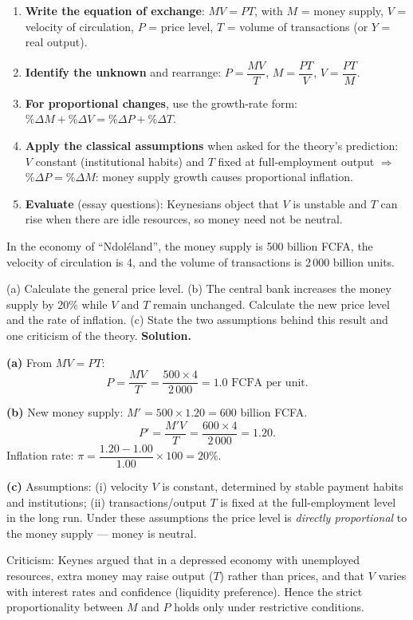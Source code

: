 \documentclass[11pt]{article}
\newcommand{\cle}[1]{{\popxbold\color{popdark}#1}}
\begin{document}
\begin{methode}[Using Fisher's equation $MV = PT$ (or $MV = PY$)]
\begin{enumerate}
\item \textbf{Write the equation of exchange}: $MV = PT$, with $M$ = money supply, $V$ = velocity of circulation, $P$ = price level, $T$ = volume of transactions (or $Y$ = real output).
\item \textbf{Identify the unknown} and rearrange: $P = \dfrac{MV}{T}$, $M = \dfrac{PT}{V}$, $V = \dfrac{PT}{M}$.
\item \textbf{For proportional changes}, use the growth-rate form: $\%\Delta M + \%\Delta V = \%\Delta P + \%\Delta T$.
\item \textbf{Apply the classical assumptions} when asked for the theory's prediction: $V$ constant (institutional habits) and $T$ fixed at full-employment output $\Rightarrow$ $\%\Delta P = \%\Delta M$: money supply growth causes proportional inflation.
\item \textbf{Evaluate} (essay questions): Keynesians object that $V$ is unstable and $T$ can rise when there are idle resources, so money need not be neutral.
\end{enumerate}
\end{methode}

\begin{exoresolu}
In the economy of ``Ndol\'eland'', the money supply is 500 billion FCFA, the velocity of circulation is 4, and the volume of transactions is 2\,000 billion units.

(a) Calculate the general price level. (b) The central bank increases the money supply by 20\% while $V$ and $T$ remain unchanged. Calculate the new price level and the rate of inflation. (c) State the two assumptions behind this result and one criticism of the theory.
\tcblower
\textbf{Solution.}

\textbf{(a)} From $MV = PT$:
\[ P = \frac{MV}{T} = \frac{500\times 4}{2\,000} = 1.0 \text{ FCFA per unit.} \]

\textbf{(b)} New money supply: $M' = 500\times 1.20 = 600$ billion FCFA.
\[ P' = \frac{M'V}{T} = \frac{600\times 4}{2\,000} = 1.20. \]
Inflation rate: $\pi = \dfrac{1.20 - 1.00}{1.00}\times 100 = 20\%$.

\textbf{(c)} Assumptions: (i) velocity $V$ is constant, determined by stable payment habits and institutions; (ii) transactions/output $T$ is fixed at the full-employment level in the long run. Under these assumptions the price level is \emph{directly proportional} to the money supply --- money is \cle{neutral}.

Criticism: Keynes argued that in a depressed economy with unemployed resources, extra money may raise output ($T$) rather than prices, and that $V$ varies with interest rates and confidence (liquidity preference). Hence the strict proportionality between $M$ and $P$ holds only under restrictive conditions.
\end{exoresolu}
\end{document}
